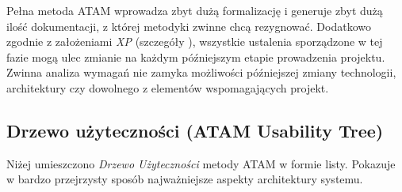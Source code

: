 Pełna metoda ATAM wprowadza zbyt dużą formalizację i generuje zbyt dużą ilość dokumentacji, z której metodyki zwinne chcą rezygnować. Dodatkowo zgodnie z założeniami \textit{XP} (szczegóły ), wszystkie ustalenia sporządzone w tej fazie mogą ulec zmianie na każdym późniejszym etapie prowadzenia projektu. Zwinna analiza wymagań nie zamyka możliwości późniejszej zmiany technologii, architektury czy dowolnego z elementów wspomagających projekt.

\subsection{Drzewo użyteczności (ATAM Usability Tree)}
\label{sec:EtapIdrzewoUzytecznosci}

Niżej umieszczono \textit{Drzewo Użyteczności} metody ATAM w formie listy. Pokazuje w bardzo przejrzysty sposób najważniejsze aspekty architektury systemu.

